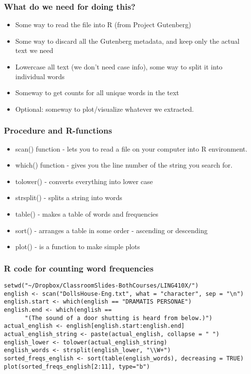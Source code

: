 \documentclass{beamer}
\begin{document}
\begin{frame}
\frametitle{What do we need for doing this?}
\begin{itemize}
\item Some way to read the file into R (from Project Gutenberg)
\item Some way to discard all the Gutenberg metadata, and keep only the actual text we need
\item Lowercase all text (we don't need case info), some way to split it into individual words
\item Someway to get counts for all unique words in the text
\item Optional: someway to plot/visualize whatever we extracted.
\end{itemize}
\end{frame}

\begin{frame}
\frametitle{Procedure and R-functions}
\begin{itemize}
\item scan() function - lets you to read a file on your computer into R environment.
\item which() function - gives you the line number of the string you search for.
\item tolower() - converts everything into lower case
\item strsplit() - splits a string into words 
\item table() - makes a table of words and frequencies
\item sort() - arranges a table in some order - ascending or descending
\item plot() - is a function to make simple plots
\end{itemize}
\end{frame}

\begin{frame}[fragile]
\frametitle{R code for counting word frequencies} 
\footnotesize
\begin{verbatim}
setwd("~/Dropbox/ClassroomSlides-BothCourses/LING410X/")
english <- scan("DollsHouse-Eng.txt", what = "character", sep = "\n")
english.start <- which(english == "DRAMATIS PERSONAE")
english.end <- which(english == 
      "(The sound of a door shutting is heard from below.)")
actual_english <- english[english.start:english.end]
actual_english_string <- paste(actual_english, collapse = " ")
english_lower <- tolower(actual_english_string)
english_words <- strsplit(english_lower, "\\W+")
sorted_freqs_english <- sort(table(english_words), decreasing = TRUE)
plot(sorted_freqs_english[2:11], type="b")
\end{verbatim}
\end{frame}
\end{document}
